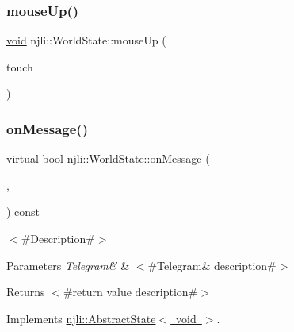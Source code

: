 \subsubsection{\texorpdfstring{mouse\+Up()}{mouseUp()}}
{\footnotesize\ttfamily \mbox{\hyperlink{_thread_8h_af1e856da2e658414cb2456cb6f7ebc66}{void}} njli\+::\+World\+State\+::mouse\+Up (\begin{DoxyParamCaption}\item[{const \mbox{\hyperlink{classnjli_1_1_device_mouse}{Device\+Mouse}} \&}]{touch }\end{DoxyParamCaption})}

\mbox{\label{classnjli_1_1_world_state_a945df2e0dac944feb4023987b9bbe874}} 
\subsubsection{\texorpdfstring{on\+Message()}{onMessage()}}
{\footnotesize\ttfamily virtual bool njli\+::\+World\+State\+::on\+Message (\begin{DoxyParamCaption}\item[{\mbox{\hyperlink{_thread_8h_af1e856da2e658414cb2456cb6f7ebc66}{void}} $\ast$}]{,  }\item[{const \mbox{\hyperlink{classnjli_1_1_telegram}{Telegram}} \&}]{ }\end{DoxyParamCaption}) const\hspace{0.3cm}{\ttfamily [virtual]}}

$<$\#\+Description\#$>$


\begin{DoxyParams}{Parameters}
{\em Telegram\&} & $<$\#\+Telegram\& description\#$>$\\
\hline
\end{DoxyParams}
\begin{DoxyReturn}{Returns}
$<$\#return value description\#$>$ 
\end{DoxyReturn}


Implements \mbox{\hyperlink{classnjli_1_1_abstract_state_aa486b2e60e57d789855acdfb555a4cdc}{njli\+::\+Abstract\+State$<$ void $>$}}.

\mbox{\label{classnjli_1_1_world_state_ab33fef32f2cdf0e1a99bc94939f17e03}} 
